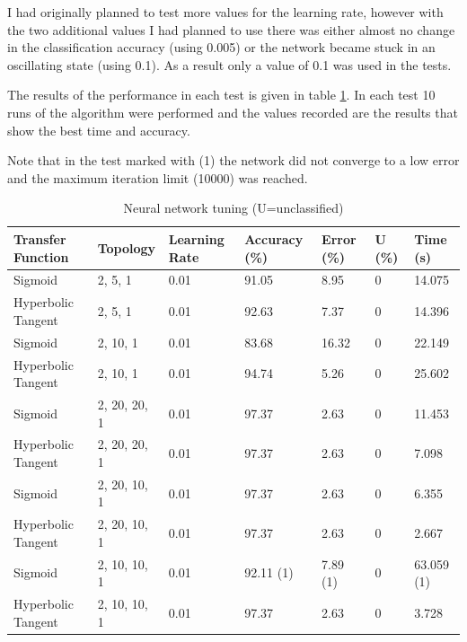 \documentclass[a4paper]{article}
\begin{document}
I had originally planned to test more values for the learning rate, however with
the two additional values I had planned to use there was either almost no change
in the classification accuracy (using 0.005) or the network became stuck in an
oscillating state (using 0.1). As a result only a value of 0.1 was used in the
tests.

The results of the performance in each test is given in table
\ref{tab:nn_tuning}. In each test 10 runs of the algorithm were performed and
the values recorded are the results that show the best time and accuracy.

Note that in the test marked with (1) the network did not converge to a low
error and the maximum iteration limit (10000) was reached.

\begin{table}[h!]
  \centering
  \begin{tabular}{@{}lllllll@{}}
    \toprule
    Transfer Function  & Topology     & Learning Rate & Accuracy (\%) & Error (\%) & U (\%) & Time (s)   \\
    \midrule
    Sigmoid            & 2, 5, 1      & 0.01          & 91.05         & 8.95       & 0      & 14.075     \\
    Hyperbolic Tangent & 2, 5, 1      & 0.01          & 92.63         & 7.37       & 0      & 14.396     \\
    Sigmoid            & 2, 10, 1     & 0.01          & 83.68         & 16.32      & 0      & 22.149     \\
    Hyperbolic Tangent & 2, 10, 1     & 0.01          & 94.74         & 5.26       & 0      & 25.602     \\
    Sigmoid            & 2, 20, 20, 1 & 0.01          & 97.37         & 2.63       & 0      & 11.453     \\
    Hyperbolic Tangent & 2, 20, 20, 1 & 0.01          & 97.37         & 2.63       & 0      & 7.098      \\
    Sigmoid            & 2, 20, 10, 1 & 0.01          & 97.37         & 2.63       & 0      & 6.355      \\
    Hyperbolic Tangent & 2, 20, 10, 1 & 0.01          & 97.37         & 2.63       & 0      & 2.667      \\
    Sigmoid            & 2, 10, 10, 1 & 0.01          & 92.11 (1)     & 7.89 (1)   & 0      & 63.059 (1) \\
    Hyperbolic Tangent & 2, 10, 10, 1 & 0.01          & 97.37         & 2.63       & 0      & 3.728      \\
    \bottomrule
  \end{tabular}
  \caption{Neural network tuning (U=unclassified)}
  \label{tab:nn_tuning}
\end{table}
\end{document}
